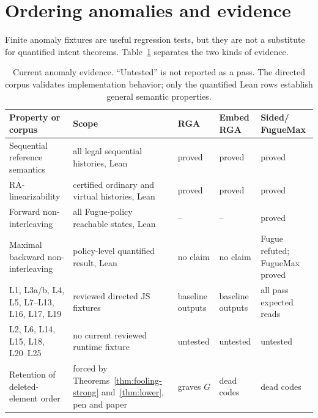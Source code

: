 \section{Ordering anomalies and evidence}

Finite anomaly fixtures are useful regression tests, but they are not a
substitute for quantified intent theorems. Table~\ref{tab:anomalies} separates
the two kinds of evidence.

\begin{table}[H]
\centering
\footnotesize
\setlength{\tabcolsep}{3pt}
\begin{tabular}{@{}>{\raggedright\arraybackslash}p{}
  >{\raggedright\arraybackslash}p{}
  >{\centering\arraybackslash}p{}
  >{\centering\arraybackslash}p{}
  >{\centering\arraybackslash}p{}@{}}
\toprule
Property or corpus & Scope & RGA & \shortstack{Embed\\RGA} & \shortstack{Sided/\\FugueMax} \\
\midrule
Sequential reference semantics & all legal sequential histories, Lean
  & proved & proved & proved \\
RA-linearizability & certified ordinary and virtual histories, Lean
  & proved & proved & proved \\
Forward non-interleaving & all Fugue-policy reachable states, Lean
  & -- & -- & proved \\
Maximal backward non-interleaving & policy-level quantified result, Lean
  & no claim & no claim & Fugue refuted; FugueMax proved \\
L1, L3a/b, L4, L5, L7--L13, L16, L17, L19 & 15 reviewed directed JS fixtures
  & baseline outputs & baseline outputs & all pass expected reads \\
L2, L6, L14, L15, L18, L20--L25 & no current reviewed runtime fixture
  & untested & untested & untested \\
Retention of deleted-element order & forced by
  Theorems~\ref{thm:fooling-strong} and~\ref{thm:lower}, pen and paper
  & graves $G$ & dead codes & dead codes \\
\bottomrule
\end{tabular}
\caption{Current anomaly evidence. ``Untested'' is not reported as a pass.
The directed corpus validates implementation behavior; only the quantified
Lean rows establish general semantic properties.}
\label{tab:anomalies}
\end{table}

